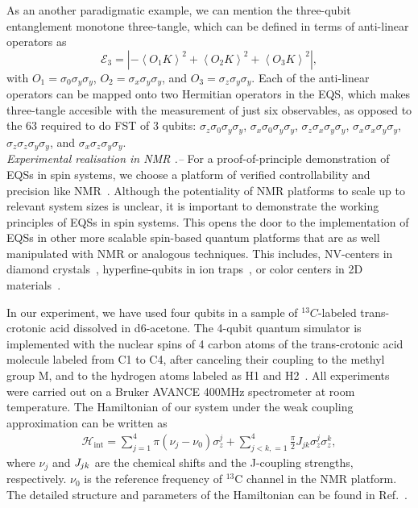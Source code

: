 \documentclass[10pt,nofootinbib,notitlepage,twocolumn,superscriptaddress]{revtex4-1}
\theoremstyle{plain}
\theoremstyle{definition}
\begin{document}
As an another paradigmatic example, we can mention the three-qubit entanglement monotone three-tangle, which can be defined in terms of anti-linear operators as
 \begin{equation}
\mathcal{E}_3=\left| -\left \langle O_1K \right \rangle^2 +\left \langle O_2K \right \rangle^2+\left \langle O_3K \right \rangle^2\right|,
\end{equation}
with $O_1=\sigma_0\sigma_y\sigma_y$, $O_2=\sigma_x\sigma_y\sigma_y$, and $O_3=\sigma_z\sigma_y\sigma_y$. Each of the anti-linear operators can be mapped onto two Hermitian operators in the EQS, which makes three-tangle accesible with the measurement of just six observables, as opposed to the $63$ required to do FST of 3 qubits: $\sigma_z\sigma_0\sigma_y\sigma_y$, $\sigma_x\sigma_0\sigma_y\sigma_y$, $\sigma_z\sigma_x\sigma_y\sigma_y$, $\sigma_x\sigma_x\sigma_y\sigma_y$, $\sigma_z\sigma_z\sigma_y\sigma_y$, and $\sigma_x\sigma_z\sigma_y\sigma_y$. 
\\

{\it{Experimental realisation in NMR .--}} For a proof-of-principle demonstration of EQSs in spin systems, we choose a platform of verified controllability and precision like NMR~\cite{Jones}. Although the potentiality of NMR platforms to scale up to relevant system sizes is unclear, it is important to demonstrate the working principles of EQSs in spin systems. This opens the door to the implementation of EQSs in other more scalable spin-based quantum platforms that are as well manipulated with NMR or analogous techniques. This includes, NV-centers in diamond crystals~\cite{Hollenberg13}, hyperfine-qubits in ion traps~\cite{Wineland03, Pedernales14}, or color centers in 2D materials~\cite{Plenio17}. 

In our experiment, we have used four qubits in a sample of $^{13}C$-labeled trans-crotonic acid dissolved in d6-acetone. The 4-qubit quantum simulator is implemented with the nuclear spins of 4 carbon atoms of the trans-crotonic acid molecule labeled from C1 to C4, after canceling their coupling to the methyl group M, and to the hydrogen atoms labeled as H1 and H2~\cite{sma}.  All experiments were carried out on a Bruker AVANCE 400MHz spectrometer at room temperature. The Hamiltonian of our system under the weak coupling approximation can be written as
\begin{align}\label{Hamiltonian}
\mathcal{H}_{\text{int}}=\sum\limits_{j=1}^4 {\pi (\nu _j-\nu _0) } \sigma_z^j  + \sum\limits_{j < k,=1}^4 {\frac{\pi}{2}} J_{jk} \sigma_z^j \sigma_z^k,
\end{align}
where $\nu_j$ and $\emph{J}_{jk}$ are the chemical shifts and the J-coupling strengths, respectively. $\nu _0$ is the reference frequency of $^{13}$C channel in the NMR platform. The detailed structure and parameters of the Hamiltonian can be found in Ref.~\cite{sma}. 
\end{document}
